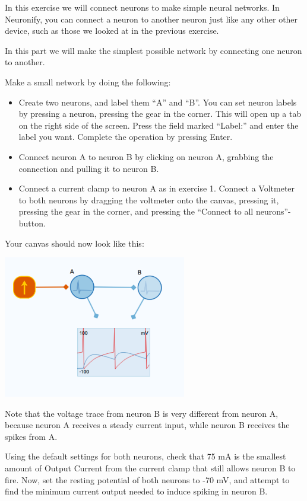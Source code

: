 \begin{Exercise}
In this exercise we will connect neurons to make simple neural networks. In Neuronify, you can connect a neuron to another neuron just like any other other device, such as those we looked at in the previous exercise. 

\begin{ExePart}
In this part we will make the simplest possible network by connecting one neuron to another. 

Make a small network by doing the following:
\begin{itemize}
\item Create two neurons, and label them ``A'' and ``B''. You can set neuron labels by pressing a neuron, pressing the gear in the \gearpos  corner. This will open up a tab on the right side of the screen. Press the field marked ``Label:'' and enter the label you want. Complete the operation by pressing Enter. 

\item Connect neuron A to neuron B by clicking on neuron A, grabbing the connection and pulling it to neuron B. 

\item Connect a current clamp to neuron A as in exercise 1. Connect a Voltmeter to both neurons by dragging the voltmeter onto the canvas, pressing it, pressing the gear in the \gearpos corner, and pressing the ``Connect to all neurons''-button.
\end{itemize}
Your canvas should now look like this: \\
\begin{center}
\includegraphics[width=8cm]{two_neurons.png}
\end{center}
\end{ExePart}

\begin{ExePart}
Note that the voltage trace from neuron B is very different from neuron A, because neuron A receives a steady current input, while neuron B receives the spikes from A. 

Using the default settings for both neurons, check that 75 mA is the smallest amount of Output Current from the current clamp that still allows neuron B to fire. Now, set the resting potential of both neurons to -70 mV, and attempt to find the minimum current output needed to induce spiking in neuron B.

\end{ExePart}
\end{Exercise}